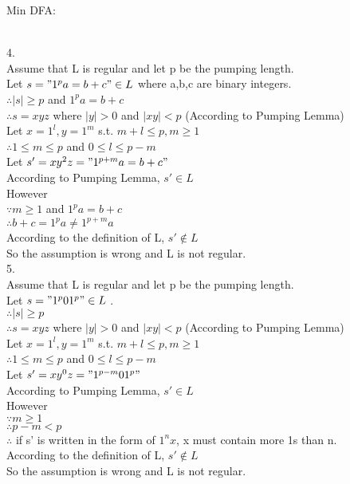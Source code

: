 \documentclass[a4paper]{article}
\begin{document}
Min DFA:\\
\\

4. \\
Assume that L is regular and let p be the pumping length.\\
Let $s =  " 1^pa=b+c " \in L$ where a,b,c are binary integers.\\
$\therefore |s| \geqslant p$ and $1^pa=b+c$\\
$\therefore s=xyz$ where $|y|>0$ and $|xy| < p$ (According to Pumping Lemma)\\
Let $x=1^l,y=1^m$ s.t. $m+l \leqslant p,m \geqslant 1$\\
$\therefore 1 \leqslant m \leqslant p$ and $0 \leqslant l \leqslant p-m$\\
Let $s'=xy^2z="1^{p+m}a=b+c"$\\
According to Pumping Lemma, $s'\in L$\\
However\\
$\because m\geqslant 1$ and $1^pa=b+c$\\
$\therefore b+c=1^pa\neq1^{p+m}a$\\
According to the definition of L, $s'\notin L$\\
So the assumption is wrong and L is not regular.\\

5. \\
Assume that L is regular and let p be the pumping length.\\
Let $s =  " 1^p01^p " \in L$ .\\
$\therefore |s| \geqslant p$ \\
$\therefore s=xyz$ where $|y|>0$ and $|xy| < p$ (According to Pumping Lemma)\\
Let $x=1^l,y=1^m$ s.t. $m+l \leqslant p,m \geqslant 1$\\
$\therefore 1 \leqslant m \leqslant p$ and $0 \leqslant l \leqslant p-m$\\
Let $s'=xy^0z="1^{p-m}01^p"$\\
According to Pumping Lemma, $s'\in L$\\
However\\
$\because m\geqslant 1$\\
$\therefore p-m<p$\\
$\therefore $ if s' is written in the form of $1^nx$, x must contain more 1s than n.\\
According to the definition of L, $s'\notin L$\\
So the assumption is wrong and L is not regular.\\
\end{document}
